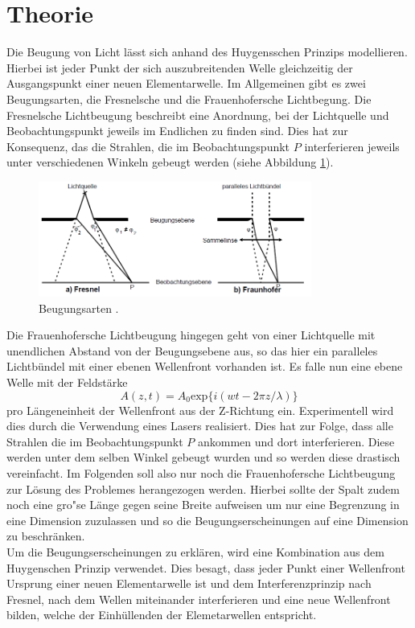 \section{Theorie}
\label{sec:Theorie}
Die Beugung von Licht lässt sich anhand des Huygensschen Prinzips modellieren. Hierbei
ist jeder Punkt der sich auszubreitenden Welle gleichzeitig der Ausgangspunkt einer neuen
Elementarwelle. Im Allgemeinen gibt es zwei Beugungsarten, die Fresnelsche und die Frauenhofersche Lichtbegung. 
Die Fresnelsche Lichtbeugung beschreibt eine Anordnung, bei der Lichtquelle und Beobachtungspunkt jeweils im Endlichen zu finden sind. 
Dies hat zur Konsequenz, das die Strahlen, die im Beobachtungspunkt $P$ interferieren jeweils unter verschiedenen Winkeln gebeugt werden (siehe Abbildung \ref{fig:Beugung}).
\begin{figure}[H]
    \centering
    \includegraphics[width=0.8\textwidth]{Beugung.png}
    \caption{Beugungsarten \cite{1}.}
    \label{fig:Beugung}
\end{figure}
\noindent
Die Frauenhofersche Lichtbeugung hingegen geht von einer Lichtquelle mit unendlichen Abstand von der Beugungsebene aus, 
so das hier ein paralleles Lichtbündel mit einer ebenen Wellenfront vorhanden ist.
 Es falle nun eine ebene Welle mit der Feldstärke
\begin{equation} 
A(z,t)= A_0 \text{exp}\{i(wt-2\pi z/\lambda)\}
\end{equation}
pro Längeneinheit der Wellenfront aus der Z-Richtung ein.
Experimentell wird dies durch die Verwendung eines Lasers realisiert.
 Dies hat zur Folge, dass alle Strahlen die im Beobachtungspunkt $P$ ankommen und dort interferieren. 
 Diese werden unter dem selben Winkel gebeugt wurden und so werden diese drastisch vereinfacht. 
 Im Folgenden soll also nur noch die Frauenhofersche Lichtbeugung zur Lösung des Problemes herangezogen werden. 
 Hierbei sollte der Spalt zudem noch eine gro"se Länge gegen seine Breite aufweisen um nur eine Begrenzung 
 in eine Dimension zuzulassen und so die Beugungserscheinungen auf eine Dimension zu beschränken.\\
Um die Beugungserscheinungen zu erklären, wird eine Kombination aus dem Huygenschen Prinzip verwendet. 
Dies besagt, dass jeder Punkt einer Wellenfront Ursprung einer neuen Elementarwelle ist und dem Interferenzprinzip nach Fresnel, 
nach dem Wellen miteinander interferieren und eine neue Wellenfront bilden, welche der Einhüllenden der Elemetarwellen entspricht. 
